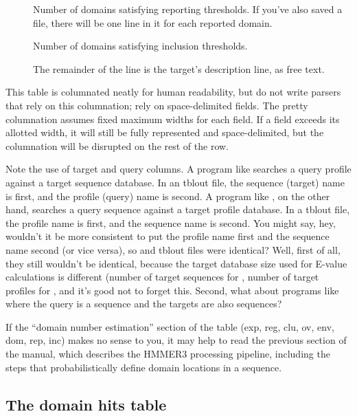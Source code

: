 \begin{description}
\item[] 
  Number of domains satisfying reporting thresholds. If you've also 
  saved a  file, there will be one line in it 
  for each reported domain.

\item[] 
  Number of domains satisfying inclusion thresholds.

\item[] 
  The remainder of the line is the target's description line, as free text.
\end{description}

This table is columnated neatly for human readability, but do not
write parsers that rely on this columnation; rely on space-delimited
fields. The pretty columnation assumes fixed maximum widths for each
field. If a field exceeds its allotted width, it will still be fully
represented and space-delimited, but the columnation will be disrupted
on the rest of the row.

Note the use of target and query columns. A program like
 searches a query profile against a target sequence
database. In an  tblout file, the sequence (target)
name is first, and the profile (query) name is second. A program like
, on the other hand, searches a query sequence against a
target profile database. In a  tblout file, the profile
name is first, and the sequence name is second. You might say, hey,
wouldn't it be more consistent to put the profile name first and the
sequence name second (or vice versa), so  and
 tblout files were identical? Well, first of all, they
still wouldn't be identical, because the target database size used for
E-value calculations is different (number of target sequences for
, number of target profiles for , and
  it's good not to forget this. Second, what about programs like
   where the query is a sequence and the targets are also
  sequences?

If the ``domain number estimation'' section of the table (exp, reg,
clu, ov, env, dom, rep, inc) makes no sense to you, it may help to
read the previous section of the manual, which describes the HMMER3
processing pipeline, including the steps that probabilistically define
domain locations in a sequence.

\subsection{The domain hits table}

